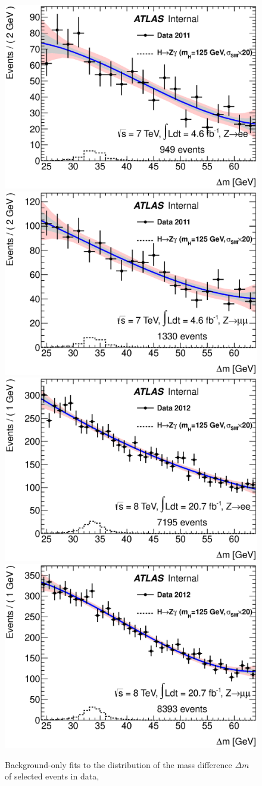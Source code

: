  \begin{figure}[!htbp]
  \begin{center}
    \includegraphics[width=0.49\columnwidth]{figures/bkgplots_e_deltaM_fit_11_CB3_fiterr_internal_withsignal}
    \includegraphics[width=0.49\columnwidth]{figures/bkgplots_mu_deltaM_fit_11_CB3_fiterr_internal_withsignal}
    \includegraphics[width=0.49\columnwidth]{figures/bkgplots_e_deltaM_fit_12_CB3_fiterr_internal_withsignal} 
    \includegraphics[width=0.49\columnwidth]{figures/bkgplots_mu_deltaM_fit_12_CB3_fiterr_internal_withsignal}
    \caption{Background-only fits to the distribution of 
      the mass difference $\Delta m$ of selected events in data,
}
\end{center}
\end{figure}
